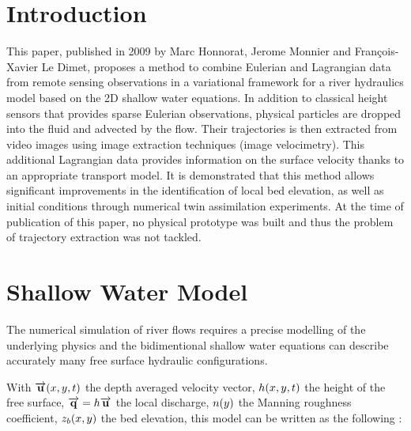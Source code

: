 


 

\maketitle 

\section{Introduction}

This paper,
published in 2009 by Marc Honnorat,
Jerome Monnier and François-Xavier Le Dimet,
proposes a method to combine Eulerian and Lagrangian data from remote sensing observations in a variational framework for a river hydraulics model based on the 2D shallow water equations.
In addition to classical height sensors that provides sparse Eulerian observations,
physical particles are dropped into the fluid and advected by the flow.
Their trajectories is then extracted from video images using image extraction techniques (image velocimetry).
This additional Lagrangian data provides information on the surface velocity thanks to an appropriate transport model.
It is demonstrated that this method allows significant improvements in the identification of local bed elevation,
as well as initial conditions through numerical twin assimilation experiments.
At the time of publication of this paper,
no physical prototype was built and thus the problem of trajectory extraction was not tackled.


\section{Shallow Water Model}

The numerical simulation of river flows requires a precise modelling of the underlying physics and the bidimentional shallow water equations can describe accurately many free surface hydraulic configurations.

\vskip 0.3cm
With $\overrightarrow{\mathbf{u}}(x,y,t)$ the depth averaged velocity vector, $h(x,y,t)$ the height of the free surface, $\overrightarrow{\mathbf{q}} = h\overrightarrow{\mathbf{u}}$ the local discharge, $n(y)$ the Manning roughness coefficient, $z_b(x,y)$ the bed elevation,  this model can be written as the following :

